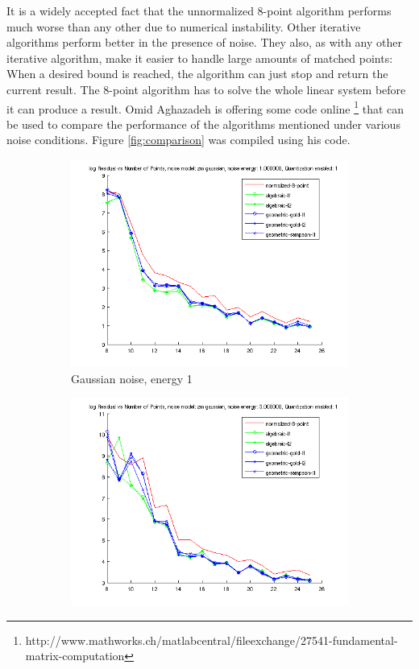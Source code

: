 \documentclass{paper}
\begin{document}
It is a widely accepted fact that the unnormalized 8-point algorithm performs much worse
than any other due to numerical instability. 
Other iterative algorithms perform better in the presence of noise. They 
also, as with any other iterative algorithm, make it easier to handle large amounts of matched points: When a
desired bound is reached, the algorithm can just stop and 
return the current result. The 8-point algorithm has to
solve the whole linear system before it can produce a result.
    Omid Aghazadeh is offering some code online
\footnote{http://www.mathworks.ch/matlabcentral/fileexchange/27541-fundamental-matrix-computation}  that can be used to 
compare the performance of the algorithms mentioned under various noise conditions. Figure \ref{fig:comparison} 
was compiled using his code.
\begin{figure}
\centering
\begin{subfigure}{0.4\textwidth}
   \includegraphics[width=\textwidth]{noise_norm1}
   \caption{Gaussian noise, energy 1}
\end{subfigure}
\begin{subfigure}{0.4\textwidth}
   \includegraphics[width=\textwidth]{noise_norm3}

\end{subfigure}
\end{figure}
\end{document}
